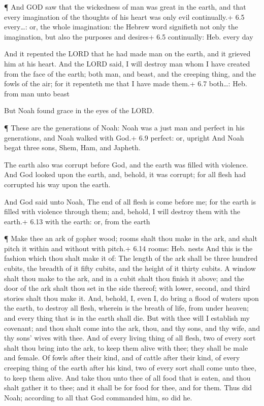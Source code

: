  ¶ And GOD saw that the wickedness of man was great in the
earth, and that every imagination of the thoughts of his heart was only
evil continually.+ 6.5 every\ldots: or, the whole imagination: the
Hebrew word signifieth not only the imagination, but also the purposes
and desires+ 6.5 continually: Heb. every day

 And it repented the LORD that he had made man on the earth,
and it grieved him at his heart.  And the LORD said, I will
destroy man whom I have created from the face of the earth; both man,
and beast, and the creeping thing, and the fowls of the air; for it
repenteth me that I have made them.+ 6.7 both\ldots: Heb. from man unto
beast

 But Noah found grace in the eyes of the LORD.

 ¶ These are the generations of Noah: Noah was a just man
and perfect in his generations, and Noah walked with God.+ 6.9 perfect:
or, upright  And Noah begat three sons, Shem, Ham, and
Japheth.

 The earth also was corrupt before God, and the earth was
filled with violence.  And God looked upon the earth, and,
behold, it was corrupt; for all flesh had corrupted his way upon the
earth.

 And God said unto Noah, The end of all flesh is come
before me; for the earth is filled with violence through them; and,
behold, I will destroy them with the earth.+ 6.13 with the earth: or,
from the earth

 ¶ Make thee an ark of gopher wood; rooms shalt thou make
in the ark, and shalt pitch it within and without with pitch.+ 6.14
rooms: Heb. nests  And this is the fashion which thou shalt
make it of: The length of the ark shall be three hundred cubits, the
breadth of it fifty cubits, and the height of it thirty cubits.
 A window shalt thou make to the ark, and in a cubit shalt
thou finish it above; and the door of the ark shalt thou set in the side
thereof; with lower, second, and third stories shalt thou make it.
 And, behold, I, even I, do bring a flood of waters upon
the earth, to destroy all flesh, wherein is the breath of life, from
under heaven; and every thing that is in the earth shall die.
 But with thee will I establish my covenant; and thou shalt
come into the ark, thou, and thy sons, and thy wife, and thy sons' wives
with thee.  And of every living thing of all flesh, two of
every sort shalt thou bring into the ark, to keep them alive with thee;
they shall be male and female.  Of fowls after their kind,
and of cattle after their kind, of every creeping thing of the earth
after his kind, two of every sort shall come unto thee, to keep them
alive.  And take thou unto thee of all food that is eaten,
and thou shalt gather it to thee; and it shall be for food for thee, and
for them.  Thus did Noah; according to all that God
commanded him, so did he.


